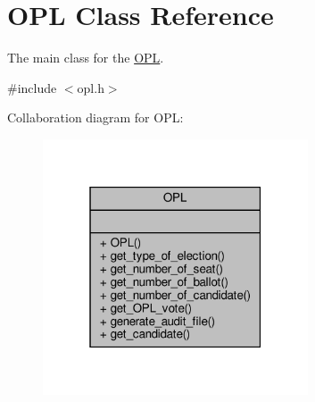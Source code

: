 \hypertarget{classOPL}{}\section{O\+PL Class Reference}
\label{classOPL}


The main class for the \hyperlink{classOPL}{O\+PL}.  




{\ttfamily \#include $<$opl.\+h$>$}



Collaboration diagram for O\+PL\+:\nopagebreak
\begin{figure}[H]
\begin{center}
\leavevmode
\includegraphics[width=223pt]{classOPL__coll__graph}
\end{center}
\end{figure}
